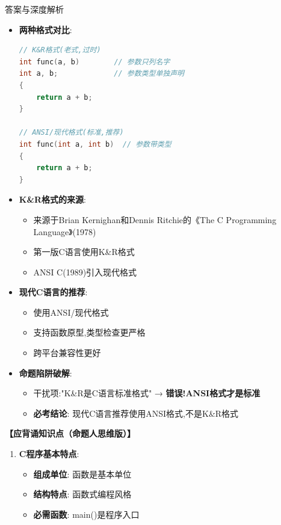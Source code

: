 \documentclass[a4paper,12pt]{article}
\begin{document}
\begin{bluebox}{答案与深度解析}
\begin{itemize}[leftmargin=*, nosep]
		\item \textbf{两种格式对比}:
		      \begin{lstlisting}[language=C]
// K&R格式(老式,过时)
int func(a, b)        // 参数只列名字
int a, b;             // 参数类型单独声明
{
    return a + b;
}

// ANSI/现代格式(标准,推荐)
int func(int a, int b)  // 参数带类型
{
    return a + b;
}
    \end{lstlisting}

		\item \textbf{K\&R格式的来源}:
		      \begin{itemize}
			      \item 来源于Brian Kernighan和Dennis Ritchie的《The C Programming Language》(1978)
			      \item 第一版C语言使用K\&R格式
			      \item ANSI C(1989)引入现代格式
		      \end{itemize}

		\item \textbf{现代C语言的推荐}:
		      \begin{itemize}
			      \item 使用ANSI/现代格式
			      \item 支持函数原型,类型检查更严格
			      \item 跨平台兼容性更好
		      \end{itemize}

		\item \textbf{命题陷阱破解}:
		      \begin{itemize}
			      \item 干扰项:"K\&R是C语言标准格式" → \textbf{错误!ANSI格式才是标准}
			      \item \textbf{必考结论}: 现代C语言推荐使用ANSI格式,不是K\&R格式
		      \end{itemize}
	\end{itemize}

	\textbf{【应背诵知识点（命题人思维版）】}
	\begin{enumerate}[leftmargin=*, nosep]
		\item \textbf{C程序基本特点}:
		      \begin{itemize}
			      \item \textbf{组成单位}: 函数是基本单位
			      \item \textbf{结构特点}: 函数式编程风格
			      \item \textbf{必需函数}: main()是程序入口
		      \end{itemize}


\end{enumerate}
\end{bluebox}
\end{document}
